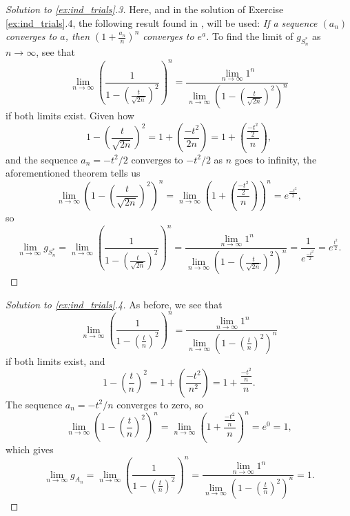 \documentclass[letterpaper, 10 pt, conference]{article}
\begin{document}
\begin{proof}[Solution to \ref{ex:ind_trials}.3]
Here, and in the solution of Exercise \ref{ex:ind_trials}.4, the following result found in \citet{Casella_Berger_2002}, will be used: \textit{If a sequence $(a_n)$ converges to $a$, then $(1 + \frac{a_n}{n})^n$ converges to $e^a$.} To find the limit of $g_{S_{n}^{\ast}}$ as $n \longrightarrow \infty$, see that
\begin{equation}
	\lim_{n \rightarrow \infty} \left( \frac{1}{1-(\frac{t}{\sqrt{2n}})^2} \right)^n = \frac{\lim_{n \rightarrow \infty} 1^n}{\lim_{n \rightarrow \infty} (1-(\frac{t}{\sqrt{2n}})^2)^n}
\end{equation}
if both limits exist. Given how 
\begin{equation}
	1-\left(\frac{t}{\sqrt{2n}}\right)^2 = 1 + \left(\frac{-t^2}{2n}\right) = 1 + \left(\frac{\frac{-t^2}{2}}{n}\right),
\end{equation}
and the sequence $a_n = -t^2 / 2$ converges to $-t^2 / 2$ as $n$ goes to infinity, the aforementioned theorem tells us 
\begin{equation}
	\lim_{n \rightarrow \infty} \left(1-(\frac{t}{\sqrt{2n}})^2\right)^n = \lim_{n \rightarrow \infty} \left(1 + \left(\frac{\frac{-t^2}{2}}{n}\right)\right)^n = e^{\frac{-t^2}{2}},
\end{equation}
so 
\begin{equation}
	\lim_{n \rightarrow \infty} g_{S_{n}^{\ast}} = \lim_{n \rightarrow \infty} \left( \frac{1}{1-(\frac{t}{\sqrt{2n}})^2} \right)^n = \frac{\lim_{n \rightarrow \infty} 1^n}{\lim_{n \rightarrow \infty} (1-(\frac{t}{\sqrt{2n}})^2)^n} = \frac{1}{e^{\frac{-t^2}{2}}} = e^{\frac{t^2}{2}}.
\end{equation}
\end{proof}
\begin{proof}[Solution to \ref{ex:ind_trials}.4]
	As before, we see that
	\begin{equation}
		\lim_{n \rightarrow \infty}  \left( \frac{1}{1-(\frac{t}{n})^2} \right)^n = \frac{\lim_{n \rightarrow \infty} 1^n}{\lim_{n \rightarrow \infty} \left( 1-(\frac{t}{n})^2 \right)^n}
	\end{equation}
	if both limits exist, and
\begin{equation}
	1-(\frac{t}{n})^2 = 1 + \left( \frac{-t^2}{n^2}\right) = 1 + \frac{\frac{-t^2}{n}}{n}.
\end{equation}
The sequence $a_n = -t^2 / n$ converges to zero, so 
\begin{equation}
	\lim_{n \rightarrow \infty} \left( 1-\left(\frac{t}{n}\right)^2 \right)^n = \lim_{n \rightarrow \infty} \left( 1 + \frac{\frac{-t^2}{n}}{n}\right)^n = e^0 = 1,
\end{equation}
which gives 
\begin{equation}
	\lim_{n \rightarrow \infty} g_{A_n} = \lim_{n \rightarrow \infty}  \left( \frac{1}{1-(\frac{t}{n})^2} \right)^n = \frac{\lim_{n \rightarrow \infty} 1^n}{\lim_{n \rightarrow \infty} \left( 1-(\frac{t}{n})^2 \right)^n} = 1.
\end{equation}
\end{proof}



\end{document}
